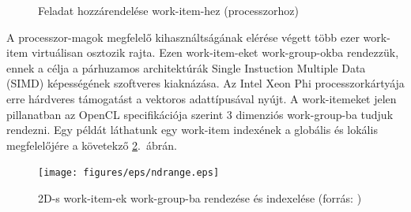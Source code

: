 	\begin{figure}[!ht]
		\centering
		\hfil
		\caption{Feladat hozzárendelése work-item-hez (processzorhoz)}
		\label{fig:parallel}
	\end{figure}
	A processzor-magok megfelelő kihasználtságának elérése végett több ezer
	work-item virtuálisan osztozik rajta.
	Ezen work-item-eket work-group-okba rendezzük, ennek a célja a párhuzamos architektúrák Single Instuction Multiple Data (SIMD)
	képességének szoftveres kiaknázása. Az Intel Xeon Phi processzorkártyája erre  hárdveres támogatást a vektoros
	adattípusával nyújt.
	A work-itemeket jelen pillanatban az OpenCL specifikációja \cite{opencl} szerint $3$ dimenziós
	work-group-ba tudjuk rendezni. Egy példát láthatunk egy work-item indexének a globális és lokális megfelelőjére a
	követekző \ref{fig:ndrange}.~ábrán.
	\begin{figure}[H]
		\centering
		\texttt{[image: figures/eps/ndrange.eps]}
		\caption{2D-s work-item-ek work-group-ba rendezése és indexelése (forrás: \cite{opencl})} 
		\label{fig:ndrange} 
	\end{figure}
	
